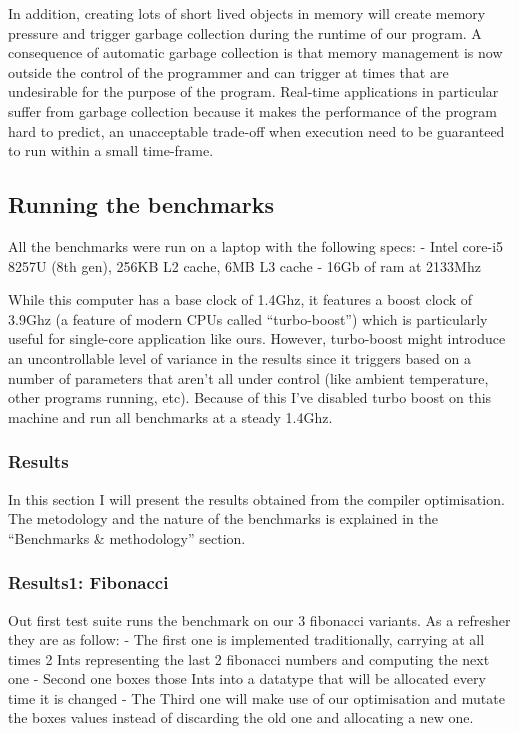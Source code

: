 \documentclass[
]{article}
\begin{document}
In addition, creating lots of short lived objects in memory will create
memory pressure and trigger garbage collection during the runtime of our
program. A consequence of automatic garbage collection is that memory
management is now outside the control of the programmer and can trigger
at times that are undesirable for the purpose of the program. Real-time
applications in particular suffer from garbage collection because it
makes the performance of the program hard to predict, an unacceptable
trade-off when execution need to be guaranteed to run within a small
time-frame.

\hypertarget{running-the-benchmarks}{%
\subsection{Running the benchmarks}\label{running-the-benchmarks}}

All the benchmarks were run on a laptop with the following specs: -
Intel core-i5 8257U (8th gen), 256KB L2 cache, 6MB L3 cache - 16Gb of
ram at 2133Mhz

While this computer has a base clock of 1.4Ghz, it features a boost
clock of 3.9Ghz (a feature of modern CPUs called ``turbo-boost'') which
is particularly useful for single-core application like ours. However,
turbo-boost might introduce an uncontrollable level of variance in the
results since it triggers based on a number of parameters that aren't
all under control (like ambient temperature, other programs running,
etc). Because of this I've disabled turbo boost on this machine and run
all benchmarks at a steady 1.4Ghz.

\hypertarget{results}{%
\subsubsection{Results}\label{results}}

In this section I will present the results obtained from the compiler
optimisation. The metodology and the nature of the benchmarks is
explained in the ``Benchmarks \& methodology'' section.

\hypertarget{results1-fibonacci}{%
\subsubsection{Results1: Fibonacci}\label{results1-fibonacci}}

Out first test suite runs the benchmark on our 3 fibonacci variants. As
a refresher they are as follow: - The first one is implemented
traditionally, carrying at all times 2 Ints representing the last 2
fibonacci numbers and computing the next one - Second one boxes those
Ints into a datatype that will be allocated every time it is changed -
The Third one will make use of our optimisation and mutate the boxes
values instead of discarding the old one and allocating a new one.
\end{document}
